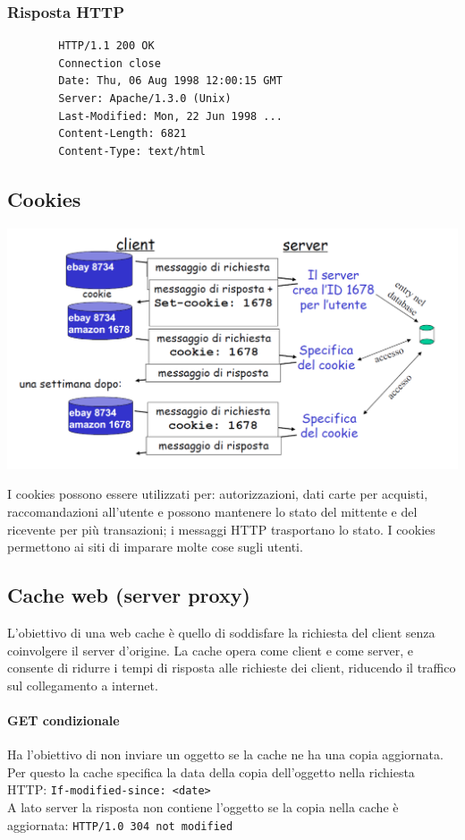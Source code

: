 \documentclass{report}
\begin{document}
	\subsubsection{Risposta HTTP}
	\begin{verbatim}
		HTTP/1.1 200 OK
		Connection close
		Date: Thu, 06 Aug 1998 12:00:15 GMT
		Server: Apache/1.3.0 (Unix)
		Last-Modified: Mon, 22 Jun 1998 ...
		Content-Length: 6821
		Content-Type: text/html
	\end{verbatim}
	\subsection{Cookies}
	\begin{center}
		\includegraphics[width=0.7\linewidth]{cookies.png}
	\end{center}
	I cookies possono essere utilizzati per: autorizzazioni, dati carte per acquisti, raccomandazioni all'utente e possono mantenere lo stato del mittente e del ricevente per più transazioni; i messaggi HTTP trasportano lo stato. I cookies permettono ai siti di imparare molte cose sugli utenti.
	\subsection{Cache web (server proxy)}
	L'obiettivo di una web cache è quello di soddisfare la richiesta del client senza coinvolgere il server d'origine. La cache opera come client e come server, e consente di ridurre i tempi di risposta alle richieste dei client, riducendo il traffico sul collegamento a internet.
	\paragraph{GET condizionale} Ha l'obiettivo di non inviare un oggetto se la cache ne ha una copia aggiornata. 
	\\Per questo la cache specifica la data della copia dell'oggetto nella richiesta HTTP: \verb|If-modified-since: <date>|
	\\A lato server la risposta non contiene l'oggetto se la copia nella cache è aggiornata: \verb|HTTP/1.0 304 not modified|
\end{document}
